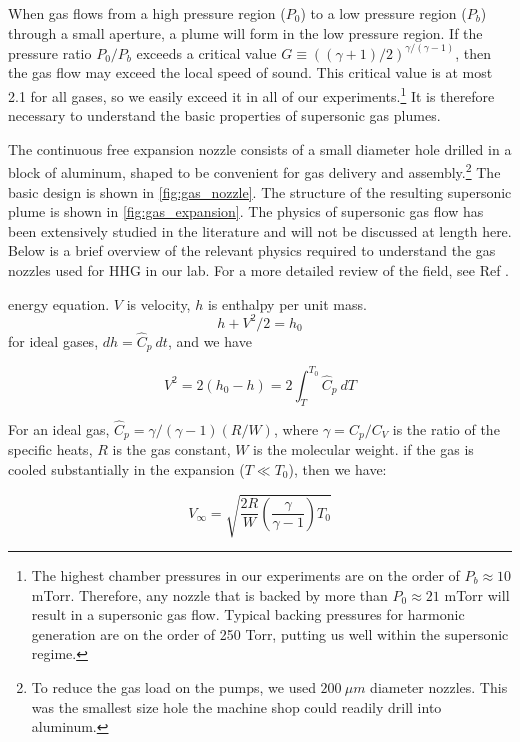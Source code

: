 When gas flows from a high pressure region ($P_0$) to a low pressure region ($P_b$) through a small aperture, a plume will form in the low pressure region. If the pressure ratio $P_0/P_b$ exceeds a critical value $G \equiv ((\gamma+1)/2)^{\gamma/(\gamma-1)}$, then the gas flow may exceed the local speed of sound. This critical value is at most 2.1 for all gases, so we easily exceed it in all of our experiments.\footnote{The highest chamber pressures in our experiments are on the order of $P_b \approx 10$ mTorr. Therefore, any nozzle that is backed by more than $P_0 \approx 21$ mTorr will result in a supersonic gas flow. Typical backing pressures for harmonic generation are on the order of 250 Torr, putting us well within the supersonic regime.} It is therefore necessary to understand the basic properties of supersonic gas plumes.

The continuous free expansion nozzle consists of a small diameter hole drilled in a block of aluminum, shaped to be convenient for gas delivery and assembly.\footnote{To reduce the gas load on the pumps, we used $200 \ \mu m$ diameter nozzles. This was the smallest size hole the machine shop could readily drill into aluminum.} The basic design is shown in \cref{fig:gas_nozzle}. The structure of the resulting supersonic plume is shown in \cref{fig:gas_expansion}. The physics of supersonic gas flow has been extensively studied in the literature and will not be discussed at length here. Below is a brief overview of the relevant physics required to understand the gas nozzles used for HHG in our lab. For a more detailed review of the field, see Ref \cite{millerFreeJetSources1988}.

energy equation. $V$ is velocity, $h$ is enthalpy per unit mass.
\begin{equation}
h + V^2/2 = h_0
\end{equation}
for ideal gases, $dh = \hat{C}_p \ dt$, and we have

\begin{equation}
V^2 = 2(h_0 -h) = 2 \int_{T}^{T_0} \hat{C}_p \ dT
\label{eqn:Scoles_gas_jet_energy}
\end{equation}

For an ideal gas, $\hat{C}_p = \gamma / (\gamma-1) (R/W)$, where $\gamma = C_p/C_V$ is the ratio of the specific heats, $R$ is the gas constant, $W$ is the molecular weight. if the gas is cooled substantially in the expansion ($T \ll T_0$), then we have:

\begin{equation}
V_{\infty} = \sqrt{ \frac{2R}{W} \left( \frac{\gamma}{\gamma-1} \right) T_0 }
\end{equation}


